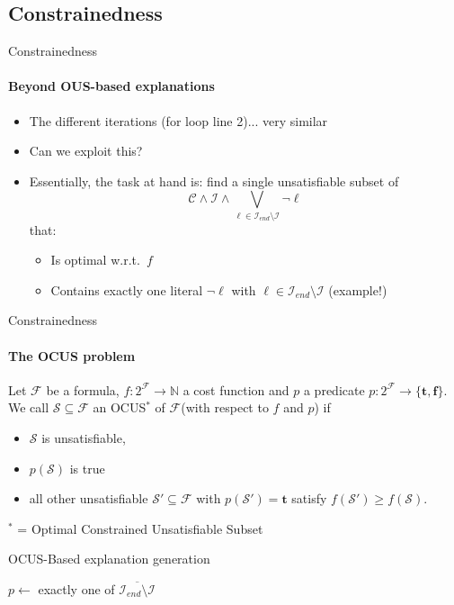 \documentclass{beamer}
\newcommand\m[1]{\ensuremath{\mathcal{#1}}\xspace}
\newcommand\formula{\ensuremath{\m{F} }\xspace}
\renewcommand\emph[1]{{\color{vuborange}#1}}
\newcommand\Iend{\m{I_{\mathit{end}}}}
\newcommand\nat{\m{\mathbb{N}}}
\newcommand\subsetT{\m{\mathcal{S}}}
\newcommand\ltrue{\m{\textbf{t}}}
\newcommand\lfalse{\m{\textbf{f}}}
\begin{document}
\subsection{Constrainedness}

\begin{frame}{Constrainedness}
	\framesubtitle{Beyond OUS-based explanations}
	\begin{itemize}
		\item The different iterations (for loop line 2)... very similar
		\item Can we exploit this? 
		\pause
		\item Essentially, the task at hand is: find a single unsatisfiable subset of 
		\[\m{C} \land \m{I} \land \bigvee_{\ell\in \Iend\setminus \m{I}}\lnot \ell\]
		that:
		\begin{itemize}
			\item Is optimal w.r.t.\ $f$
			\item Contains \emph{exactly one} literal $\lnot \ell$ with $\ell \in \Iend\setminus \m{I} $ (\emph{example!})
		\end{itemize}
		
	\end{itemize}	
\end{frame}
% 
\begin{frame}{Constrainedness}
	\framesubtitle{The OCUS problem}
	\begin{definition}
			\small
		Let $\formula$ be a formula, $f:2^{\formula} \to \nat$ a cost function and  $p$ a predicate $p: 2^{\formula}\to \{\ltrue,\lfalse\}$. We call %
		$\subsetT \subseteq \formula$ an \emph{OCUS}$^*$ of \formula (with respect to $f$ and $p$) if \begin{itemize}                                      
			\item $\subsetT$ is unsatisfiable,
			\item $p(\subsetT)$ is true
			\item \emph{all other unsatisfiable $\subsetT'\subseteq \formula$ with $p(\subsetT')=\ltrue$ satisfy $f(\subsetT')\geq f(\subsetT)$}.
		\end{itemize}
	\end{definition}
	$^*$ = Optimal \emph{Constrained} Unsatisfiable Subset
\end{frame}


\newcommand\onestepo{\ensuremath{\call{explain-One-Step-ocus}}\xspace}
\begin{frame}{OCUS-Based explanation generation}
	\begin{algorithm}[H]
		\DontPrintSemicolon
		\caption{$\onestepo(\m{C},f,\m{I},\Iend)$}
		\label{alg:oneStepOCUS}
		$p \leftarrow$ exactly one of $\overline{\Iend\setminus \m{I}}$\;
		\Return{$\call{OCUS}(\m{C}\land \m{I}\land \overline{\Iend\setminus \m{I}}, f, p)$} 
	\end{algorithm}
\end{frame}
\end{document}
